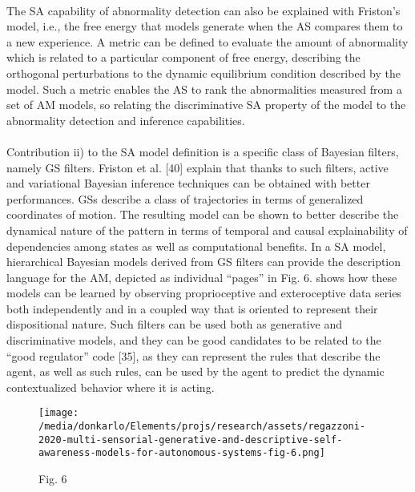 \documentclass{article}
\begin{document}
		\paragraph{} The SA capability of abnormality detection can also be
		explained with Friston’s model, i.e., the free energy that
		models generate when the AS compares them to a new
		experience. A metric can be defined to evaluate the amount
		of abnormality which is related to a particular component
		of free energy, describing the orthogonal perturbations to the
		dynamic equilibrium condition described by the model. Such
		a metric enables the AS to rank the abnormalities measured
		from a set of AM models, so relating the discriminative
		SA property of the model to the abnormality detection and
		inference capabilities.
		\paragraph{}Contribution ii) to the SA model definition is a specific class
		of Bayesian filters, namely GS filters. Friston et al. [40] explain
		that thanks to such filters, active and variational Bayesian
		inference techniques can be obtained with better performances.
		GSs describe a class of trajectories in terms of generalized
		coordinates of motion. The resulting model can be shown to
		better describe the dynamical nature of the pattern in terms
		of temporal and causal explainability of dependencies among
		states as well as computational benefits. In a SA model,
		hierarchical Bayesian models derived from GS filters can
		provide the description language for the AM, depicted as
		individual “pages” in Fig. 6. \citet{regazzoni-2020-multi-sensorial-generative-and-descriptive-self-awareness-models-for-autonomous-systems} shows how these models
		can be learned by observing proprioceptive and exteroceptive
		data series both independently and in a coupled way that is
		oriented to represent their dispositional nature. Such filters can
		be used both as generative and discriminative models, and they
		can be good candidates to be related to the “good regulator”
		code [35], as they can represent the rules that describe the
		agent, as well as such rules, can be used by the agent to predict
		the dynamic contextualized behavior where it is acting.
		\begin{figure*}
			\centering
			\texttt{[image: /media/donkarlo/Elements/projs/research/assets/regazzoni-2020-multi-sensorial-generative-and-descriptive-self-awareness-models-for-autonomous-systems-fig-6.png]}
			\caption{\citet{regazzoni-2020-multi-sensorial-generative-and-descriptive-self-awareness-models-for-autonomous-systems} Fig. 6}
			\label{fig:regazzoni-2020-multi-sensorial-generative-and-descriptive-self-awareness-models-for-autonomous-systems-fig-6.png}
		\end{figure*}
\end{document}
